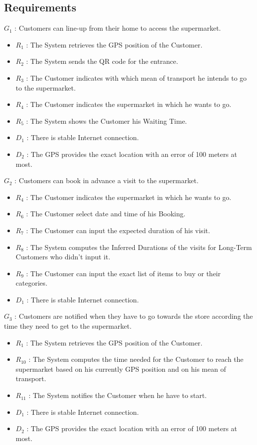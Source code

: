 \subsection{Requirements}

$G_1$ : Customers can line-up from their home to access the supermarket.
\begin{itemize}
	\item $R_1$ : The System retrieves the GPS position of the Customer.
	\item $R_2$ : The System sends the QR code for the entrance.
	\item $R_3$ : The Customer indicates with which mean of transport he intends to go to the supermarket.
	\item $R_4$ : The Customer indicates the supermarket in which he wants to go.
	\item $R_5$ : The System shows the Customer his Waiting Time.
	\item $D_1$ : There is stable Internet connection. 
	\item $D_2$ : The GPS provides the exact location with an error of 100 meters at most. 
\end{itemize}
$G_2$ : Customers can book in advance a visit to the supermarket.
\begin{itemize}
	\item $R_4$ : The Customer indicates the supermarket in which he wants to go.
	\item $R_6$ : The Customer select date and time of his Booking.
	\item $R_7$ : The Customer can input the expected duration of his visit.
	\item $R_8$ : The System computes the Inferred Durations of the visits for Long-Term Customers who didn't input it.
	\item $R_9$ : The Customer can input the exact list of items to buy or their categories. 
	\item $D_1$ : There is stable Internet connection.
\end{itemize}
$G_3$ : Customers are notified when they have to go towards the store according the time they need to get to the supermarket.
\begin{itemize}
	\item $R_1$ : The System retrieves the GPS position of the Customer. 
	\item $R_{10}$ : The System computes the time needed for the Customer to reach the supermarket based on his currently GPS position and on his mean of transport.
	\item $R_{11}$ : The System notifies the Customer when he have to start.
	\item $D_1$ : There is stable Internet connection.
	\item $D_2$ : The GPS provides the exact location with an error of 100 meters at most. 
\end{itemize}
